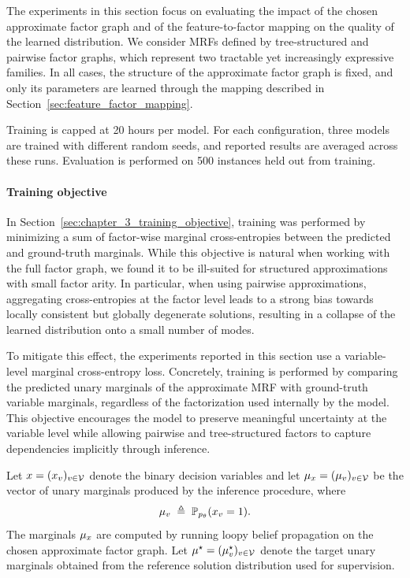 The experiments in this section focus on evaluating the impact of the chosen approximate factor graph and of the feature-to-factor mapping on the quality of the learned distribution. We consider MRFs defined by tree-structured and pairwise factor graphs, which represent two tractable yet increasingly expressive families. In all cases, the structure of the approximate factor graph is fixed, and only its parameters are learned through the mapping described in Section~\ref{sec:feature_factor_mapping}.

Training is capped at 20 hours per model. For each configuration, three models are trained with different random seeds, and reported results are averaged across these runs. Evaluation is performed on 500 instances held out from training.

\paragraph{Training objective}
In Section~\ref{sec:chapter_3_training_objective}, training was performed by minimizing a sum of factor-wise marginal cross-entropies between the predicted and ground-truth marginals. While this objective is natural when working with the full factor graph, we found it to be ill-suited for structured approximations with small factor arity. In particular, when using pairwise approximations, aggregating cross-entropies at the factor level leads to a strong bias towards locally consistent but globally degenerate solutions, resulting in a collapse of the learned distribution onto a small number of modes.

To mitigate this effect, the experiments reported in this section use a variable-level marginal cross-entropy loss. Concretely, training is performed by comparing the predicted unary marginals of the approximate MRF with ground-truth variable marginals, regardless of the factorization used internally by the model. This objective encourages the model to preserve meaningful uncertainty at the variable level while allowing pairwise and tree-structured factors to capture dependencies implicitly through inference.

Let $x=(x_v)_{v\in \mathcal{V}}$ denote the binary decision variables and let $\mu_x = (\mu_v)_{v\in \mathcal{V}}$ be the vector of unary marginals produced by the inference procedure, where
\[
\mu_v \;\triangleq\; \mathbb{P}_{p_{\theta}}(x_v=1).
\]
The marginals $\mu_{x}$ are computed by running loopy belief propagation on the chosen approximate factor graph. Let $\mu^{\star}=(\mu^{\star}_v)_{v\in\mathcal{V}}$ denote the target unary marginals obtained from the reference solution distribution used for supervision.

